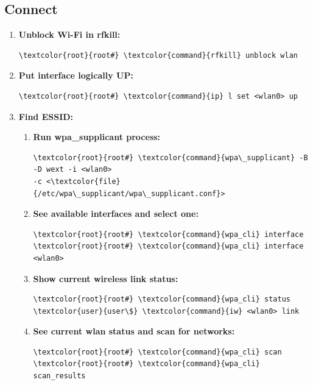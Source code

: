 \documentclass[10pt, a4paper, onecolumn, oneside, titlepage, openany]{book}
\begin{document}
\subsection{Connect}
\begin{enumerate}
    \item \textbf{Unblock Wi-Fi in rfkill:}
\begin{Verbatim}[commandchars=\\\{\}]
\textcolor{root}{root#} \textcolor{command}{rfkill} unblock wlan
\end{Verbatim}
    \item \textbf{Put interface logically UP:}
\begin{Verbatim}[commandchars=\\\{\}]
\textcolor{root}{root#} \textcolor{command}{ip} l set <wlan0> up
\end{Verbatim}
    \item \textbf{Find ESSID:}
    \begin{enumerate}
        \item \textbf{Run wpa\_supplicant process:}
\begin{Verbatim}[commandchars=\\\{\}]
\textcolor{root}{root#} \textcolor{command}{wpa\_supplicant} -B -D wext -i <wlan0>
-c <\textcolor{file}{/etc/wpa\_supplicant/wpa\_supplicant.conf}>
\end{Verbatim}        
        \item \textbf{See available interfaces and select one:}
\begin{Verbatim}[commandchars=\\\{\}]
\textcolor{root}{root#} \textcolor{command}{wpa_cli} interface
\textcolor{root}{root#} \textcolor{command}{wpa_cli} interface <wlan0>
\end{Verbatim}
        \item \textbf{Show current wireless link status:}
\begin{Verbatim}[commandchars=\\\{\}]
\textcolor{root}{root#} \textcolor{command}{wpa_cli} status
\textcolor{user}{user\$} \textcolor{command}{iw} <wlan0> link
\end{Verbatim}
         \item \textbf{See current wlan status and scan for networks:}
\begin{Verbatim}[commandchars=\\\{\}]
\textcolor{root}{root#} \textcolor{command}{wpa_cli} scan
\textcolor{root}{root#} \textcolor{command}{wpa_cli} scan_results
\end{Verbatim}

\end{enumerate}
\end{enumerate}
\end{document}

